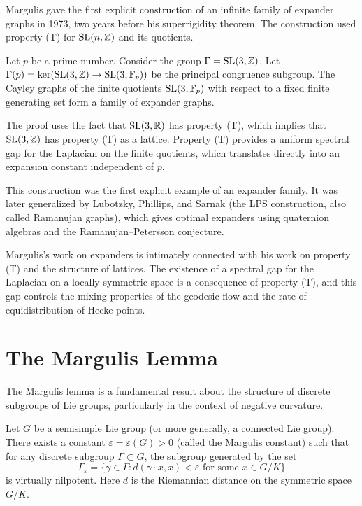 Margulis gave the first explicit construction of an infinite family of expander graphs in 1973, two years before his superrigidity theorem. The construction used property (T) for \(\operatorname{SL}(n,\mathbb{Z})\) and its quotients.

\begin{theorem}[Margulis, 1973]
Let \(p\) be a prime number. Consider the group \(\Gamma = \operatorname{SL}(3,\mathbb{Z})\). Let \(\Gamma(p) = \ker(\operatorname{SL}(3,\mathbb{Z}) \to \operatorname{SL}(3,\mathbb{F}_p))\) be the principal congruence subgroup. The Cayley graphs of the finite quotients \(\operatorname{SL}(3,\mathbb{F}_p)\) with respect to a fixed finite generating set form a family of expander graphs.
\end{theorem}

The proof uses the fact that \(\operatorname{SL}(3,\mathbb{R})\) has property (T), which implies that \(\operatorname{SL}(3,\mathbb{Z})\) has property (T) as a lattice. Property (T) provides a uniform spectral gap for the Laplacian on the finite quotients, which translates directly into an expansion constant independent of \(p\).

This construction was the first explicit example of an expander family. It was later generalized by Lubotzky, Phillips, and Sarnak (the LPS construction, also called Ramanujan graphs), which gives optimal expanders using quaternion algebras and the Ramanujan--Petersson conjecture.

Margulis's work on expanders is intimately connected with his work on property (T) and the structure of lattices. The existence of a spectral gap for the Laplacian on a locally symmetric space is a consequence of property (T), and this gap controls the mixing properties of the geodesic flow and the rate of equidistribution of Hecke points.

\section{The Margulis Lemma}

The Margulis lemma is a fundamental result about the structure of discrete subgroups of Lie groups, particularly in the context of negative curvature.

\begin{theorem}
Let \(G\) be a semisimple Lie group (or more generally, a connected Lie group). There exists a constant \(\varepsilon = \varepsilon(G) > 0\) (called the Margulis constant) such that for any discrete subgroup \(\Gamma \subset G\), the subgroup generated by the set
\[
\Gamma_\varepsilon = \{\gamma \in \Gamma : d(\gamma \cdot x, x) < \varepsilon \text{ for some } x \in G/K\}
\]
is virtually nilpotent. Here \(d\) is the Riemannian distance on the symmetric space \(G/K\).
\end{theorem}

